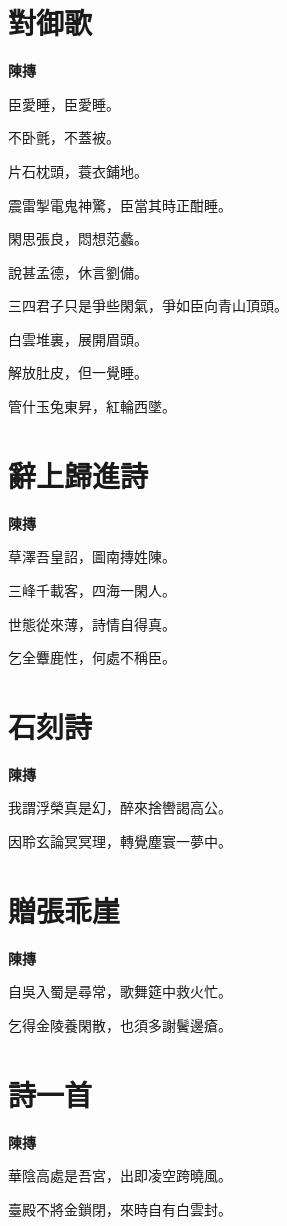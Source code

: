 \documentclass[12pt,a4paper]{ctexbook}
\begin{document}
\section{對御歌}
\textbf{陳摶}\par\vspace{0.5em}
臣愛睡，臣愛睡。\par
不卧氈，不蓋被。\par
片石枕頭，蓑衣鋪地。\par
震雷掣電鬼神驚，臣當其時正酣睡。\par
閑思張良，悶想范蠡。\par
說甚孟德，休言劉備。\par
三四君子只是爭些閑氣，爭如臣向青山頂頭。\par
白雲堆裏，展開眉頭。\par
解放肚皮，但一覺睡。\par
管什玉兔東昇，紅輪西墜。\par

\section{辭上歸進詩}
\textbf{陳摶}\par\vspace{0.5em}
草澤吾皇詔，圖南摶姓陳。\par
三峰千載客，四海一閑人。\par
世態從來薄，詩情自得真。\par
乞全麞鹿性，何處不稱臣。\par

\section{石刻詩}
\textbf{陳摶}\par\vspace{0.5em}
我謂浮榮真是幻，醉來捨轡謁高公。\par
因聆玄論冥冥理，轉覺塵寰一夢中。\par

\section{贈張乖崖}
\textbf{陳摶}\par\vspace{0.5em}
自吳入蜀是尋常，歌舞筵中救火忙。\par
乞得金陵養閑散，也須多謝鬢邊瘡。\par

\section{詩一首}
\textbf{陳摶}\par\vspace{0.5em}
華陰高處是吾宮，出即凌空跨曉風。\par
臺殿不將金鎖閉，來時自有白雲封。\par
\end{document}

